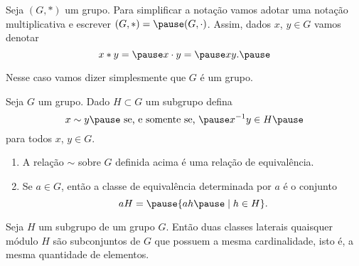 \documentclass{beamer}
\begin{document}
    \begin{frame}
        Seja $(G, *)$ um grupo. \pause Para simplificar a notação \pause vamos adotar uma notação multiplicativa \pause e escrever $(G, *) = \pause (G, \cdot)$. \pause Assim, dados $x$, $y \in G$ vamos denotar\pause
        \[
            x * y = \pause x \cdot y = \pause xy.\pause
        \]

        Nesse caso vamos dizer simplesmente que $G$ é um grupo.
    \end{frame}

    \begin{frame}
        \begin{proposicao}
            Seja $G$ um grupo. \pause Dado $H \subset G$ um subgrupo \pause defina \pause
            \[
                x \sim y \pause \mbox{ se, e somente se, } \pause x^{-1}y \in H \pause
            \]
            para todos $x$, $y \in G$. \pause
            \begin{enumerate}[label={\arabic*})]
                \item A relação $\sim$ \pause sobre $G$ definida acima é uma relação de equivalência. \pause

                \item Se $a \in G$, \pause então a classe de equivalência determinada por $a$ \pause é o conjunto \pause
                \[
                    aH = \pause \{ah \pause \mid h \in H\}.
                \]
            \end{enumerate}
        \end{proposicao}
    \end{frame}

    \begin{frame}
        \begin{proposicao}
            Seja $H$ um subgrupo de um grupo $G$. \pause Então duas classes laterais quaisquer \pause módulo $H$ \pause são subconjuntos de $G$ que possuem a mesma cardinalidade, \pause isto é, a mesma quantidade de elementos. \pause
        \end{proposicao}
    \end{frame}
\end{document}
